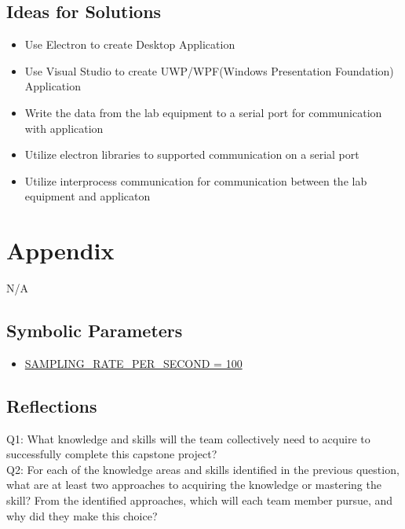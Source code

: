 \documentclass[12pt, titlepage]{article}
\begin{document}
\subsection{Ideas for Solutions}
\begin{itemize}
  \item Use Electron to create Desktop Application
  \item Use Visual Studio to create UWP/WPF(Windows Presentation Foundation) Application
  \item Write the data from the lab equipment to a serial port for communication with application
  \item Utilize electron libraries to supported communication on a serial port
  \item Utilize interprocess communication for communication between the lab equipment and applicaton
\end{itemize}




%

\newpage

\section{Appendix}

N/A

\subsection{Symbolic Parameters}

\begin{itemize}
    \color{red}
    \item \hyperref[sec:sampling]{SAMPLING\_RATE\_PER\_SECOND = 100}
\end{itemize}

\subsection{Reflections}

\noindent Q1: What knowledge and skills will the team collectively need to acquire to successfully complete this capstone project? \\
\noindent Q2: For each of the knowledge areas and skills identified in the previous question, what are at least two approaches to acquiring the knowledge or mastering the skill? 
From the identified approaches, which will each team member pursue, and why did they make this choice?\\
\end{document}
